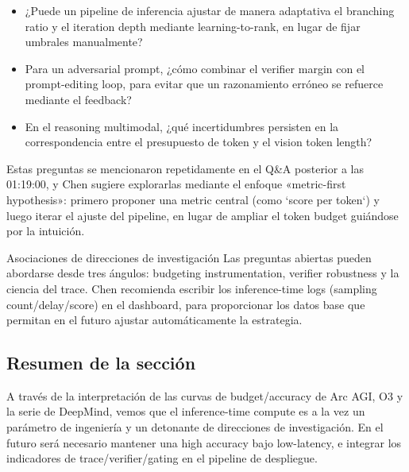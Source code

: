 \begin{itemize}
\item ¿Puede un pipeline de inferencia ajustar de manera adaptativa el branching ratio y el iteration depth mediante learning-to-rank, en lugar de fijar umbrales manualmente?
\item Para un adversarial prompt, ¿cómo combinar el verifier margin con el prompt-editing loop, para evitar que un razonamiento erróneo se refuerce mediante el feedback?
\item En el reasoning multimodal, ¿qué incertidumbres persisten en la correspondencia entre el presupuesto de token y el vision token length?
\end{itemize}

Estas preguntas se mencionaron repetidamente en el Q\&A posterior a las 01:19:00, y Chen sugiere explorarlas mediante el enfoque «metric-first hypothesis»: primero proponer una metric central (como `score per token`) y luego iterar el ajuste del pipeline, en lugar de ampliar el token budget guiándose por la intuición.

\begin{knowledgebox}{Asociaciones de direcciones de investigación}
Las preguntas abiertas pueden abordarse desde tres ángulos: budgeting instrumentation, verifier robustness y la ciencia del trace. Chen recomienda escribir los inference-time logs (sampling count/delay/score) en el dashboard, para proporcionar los datos base que permitan en el futuro ajustar automáticamente la estrategia.
\end{knowledgebox}

\subsection{Resumen de la sección}
A través de la interpretación de las curvas de budget/accuracy de Arc AGI, O3 y la serie de DeepMind, vemos que el inference-time compute es a la vez un parámetro de ingeniería y un detonante de direcciones de investigación. En el futuro será necesario mantener una high accuracy bajo low-latency, e integrar los indicadores de trace/verifier/gating en el pipeline de despliegue.

